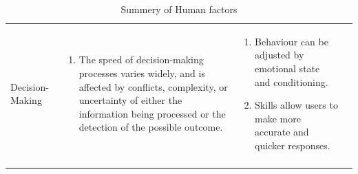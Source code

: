 \begin{longtable}{p{2.5cm} p{5cm} p{5cm} p{1cm}}
                \hline
     \rowcolor{lightgray}
       Decision-Making &
           \begin{enumerate}
           \item The speed of decision-making processes varies widely, and is affected by conflicts, complexity, or uncertainty of either the information being processed or the detection of the possible outcome.
           
           \end{enumerate} &
            \begin{enumerate}
            \item Behaviour can be adjusted by emotional state and conditioning.
            \item  Skills allow users to make more accurate and quicker responses.
            \end{enumerate} &  \cite{pavlov1927conditional} \cite{Bowman:2004:UIT:993837} \cite{fitts1967human} \\
            
    \caption{Summery of Human factors}
    \label{table:human factors}
    \end{longtable}

